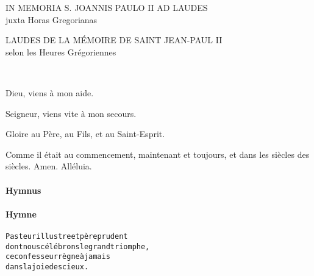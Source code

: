 \documentclass[twoside]{article}
\begin{document}
\null \newpage



\begin{paracol}[1]{2}

\begin{center}\begin{doublespace}

{

\MakeUppercase{\Large In memoria S. Joannis Paulo II ad Laudes}\\
juxta Horas Gregorianas

}
\end{doublespace}\end{center}


\switchcolumn

\begin{center}\begin{doublespace}

{
\MakeUppercase{\Large Laudes de la mémoire de Saint Jean-Paul II}\\
selon les Heures Grégoriennes

}
\end{doublespace}\end{center}

~~

\vv Dieu, viens à mon aide.

\rr Seigneur, viens vite à mon secours.

\vv Gloire au Père, au Fils, et au Saint-Esprit.

\rr Comme il était au commencement, maintenant et toujours, et dans les siècles des siècles. Amen. Alléluia.

\switchcolumn*


\paragraph{Hymnus}


\switchcolumn

\paragraph{Hymne}
\begin{alltt}\normalfont
             Pasteur illustre et père prudent
             dont nous célébrons le grand triomphe,
             ce confesseur règne à jamais
             dans la joie des cieux.
             

\end{alltt}
\end{paracol}
\end{document}
